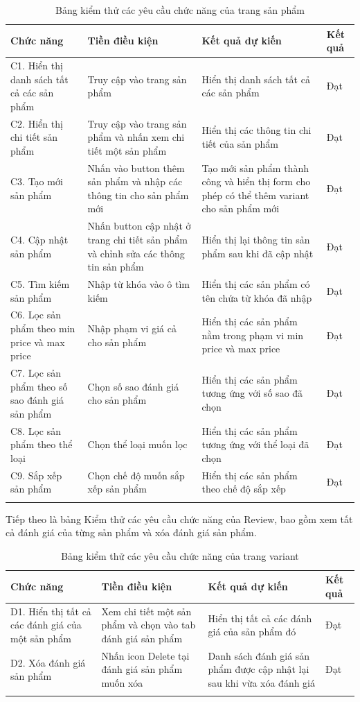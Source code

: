 \begin{longtable}{|p{4cm}|p{4cm}|p{4cm}|p{2cm}|}
    \hline
    Chức năng & Tiền điều kiện & Kết quả dự kiến & Kết quả \\
    \hline
    C1. Hiển thị danh sách tất cả các sản phẩm  & Truy cập vào trang sản phẩm & Hiển thị danh sách tất cả các sản phẩm & Đạt\\
    \hline
     C2. Hiển thị chi tiết sản phẩm  & Truy cập vào trang sản phẩm và nhấn xem chi tiết một sản phẩm & Hiển thị các thông tin chi tiết của sản phẩm & Đạt\\
    \hline
     C3. Tạo mới sản phẩm & Nhấn vào button thêm sản phẩm và nhập các thông tin cho sản phẩm mới & Tạo mới sản phẩm thành công và hiển thị form cho phép có thể thêm variant cho sản phẩm mới & Đạt\\
    \hline
    C4. Cập nhật sản phẩm & Nhấn button cập nhật ở trang chi tiết sản phẩm và chỉnh sửa các thông tin sản phẩm & Hiển thị lại thông tin sản phẩm sau khi đã cập nhật & Đạt\\
    \hline
    C5. Tìm kiếm sản phẩm & Nhập từ khóa vào ô tìm kiếm & Hiển thị các sản phẩm có tên chứa từ khóa đã nhập & Đạt \\
    \hline
    C6. Lọc sản phẩm theo min price và max price & Nhập phạm vi giá cả cho sản phẩm & Hiển thị các sản phẩm nằm trong phạm vi min price và max price & Đạt  \\
    \hline
    C7. Lọc sản phẩm theo số sao đánh giá sản phẩm & Chọn số sao đánh giá cho sản phẩm & Hiển thị các sản phẩm tương ứng với số sao đã chọn  & Đạt\\
    \hline
    C8. Lọc sản phẩm theo thể loại & Chọn thể loại muốn lọc & Hiển thị các sản phẩm tương ứng với thể loại đã chọn & Đạt \\
    \hline
    C9. Sắp xếp sản phẩm & Chọn chế độ muốn sắp xếp sản phẩm & Hiển thị các sản phẩm theo chế độ sắp xếp & Đạt\\
    \hline
    \caption{Bảng kiểm thử các yêu cầu chức năng của trang sản phẩm}
\end{longtable}
Tiếp theo là bảng Kiểm thử các yêu cầu chức năng của Review, bao gồm xem tất cả đánh giá của từng sản phẩm và xóa đánh giá sản phẩm.
\begin{longtable}{|p{4cm}|p{4cm}|p{4cm}|p{2cm}|}
    \hline
    Chức năng & Tiền điều kiện & Kết quả dự kiến & Kết quả \\
    \hline
    D1. Hiển thị tất cả các đánh giá của một sản phẩm  & Xem chi tiết một sản phẩm và chọn vào tab đánh giá sản phẩm & Hiển thị tất cả các đánh giá của sản phẩm đó & Đạt\\
    \hline
     D2. Xóa đánh giá sản phẩm  & Nhấn icon Delete tại đánh giá sản phẩm muốn xóa & Danh sách đánh giá sản phẩm được cập nhật lại sau khi vừa xóa đánh giá & Đạt\\
    \hline
    \caption{Bảng kiểm thử các yêu cầu chức năng của trang variant}
\end{longtable}
